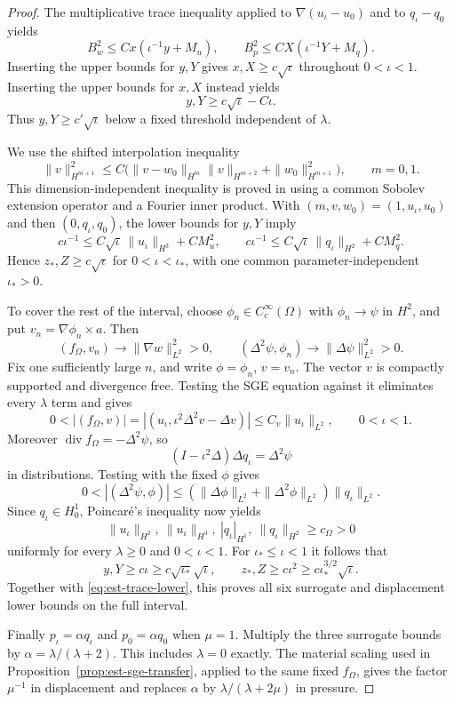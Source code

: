 \documentclass[11pt,a4paper]{article}
\theoremstyle{remark}
\numberwithin{equation}{section}
\begin{document}
\begin{proof}
The multiplicative trace inequality applied to
$\nabla(u_\iota-u_0)$ and to $q_\iota-q_0$ yields
\begin{equation}\label{eq:est-trace-lower}
 B_w^2\le Cx(\iota^{-1}y+M_u),
 \qquad B_p^2\le CX(\iota^{-1}Y+M_q).
\end{equation}
Inserting the upper bounds for $y,Y$ gives
$x,X\ge c\sqrt\iota$ throughout $0<\iota<1$.
Inserting the upper bounds for $x,X$ instead yields
\[
 y,Y\ge c\sqrt\iota-C\iota.
\]
Thus $y,Y\ge c'\sqrt\iota$ below a fixed threshold independent of
$\lambda$.

We use the shifted interpolation inequality
\begin{equation}\label{eq:est-shifted-interpolation}
 \|v\|_{H^{m+1}}^2
 \le C\bigl(\|v-w_0\|_{H^m}\|v\|_{H^{m+2}}
                      +\|w_0\|_{H^{m+1}}^2\bigr),\qquad m=0,1.
\end{equation}
This dimension-independent inequality is proved in
\cite[proof of Proposition~3.5]{PolygonCompanion2026} using a common
Sobolev extension operator and a Fourier inner product.
With $(m,v,w_0)=(1,u_\iota,u_0)$ and then
$(0,q_\iota,q_0)$, the lower bounds for $y,Y$ imply
\[
 c\iota^{-1}\le C\sqrt\iota\,\|u_\iota\|_{H^3}+CM_u^2,
 \qquad
 c\iota^{-1}\le C\sqrt\iota\,\|q_\iota\|_{H^2}+CM_q^2.
\]
Hence $z_*,Z\ge c\sqrt\iota$ for
$0<\iota<\iota_*$, with one common parameter-independent
$\iota_*>0$.

To cover the rest of the interval, choose
$\phi_n\in C_c^\infty(\Omega)$ with $\phi_n\to\psi$ in $H^2$, and
put $v_n=\nabla\phi_n\times a$. Then
\[
 (f_\Omega,v_n)\longrightarrow\|\nabla w\|_{L^2}^2>0,
 \qquad
 (\Delta^2\psi,\phi_n)\longrightarrow\|\Delta\psi\|_{L^2}^2>0.
\]
Fix one sufficiently large $n$, and write $\phi=\phi_n$, $v=v_n$.
The vector $v$ is compactly supported and divergence free. Testing the
SGE equation against it eliminates every $\lambda$ term and gives
\[
 0<|(f_\Omega,v)|
 =|(u_\iota,\iota^2\Delta^2v-\Delta v)|
 \le C_v\|u_\iota\|_{L^2},\qquad 0<\iota<1.
\]
Moreover $\operatorname{div}f_\Omega=-\Delta^2\psi$, so
\[
 (I-\iota^2\Delta)\Delta q_\iota=\Delta^2\psi
\]
in distributions. Testing with the fixed $\phi$ gives
\[
 0<|(\Delta^2\psi,\phi)|
 \le(\|\Delta\phi\|_{L^2}+\|\Delta^2\phi\|_{L^2})
                  \|q_\iota\|_{L^2}.
\]
Since $q_\iota\in H_0^1$, Poincar\'e's inequality now yields
\[
 \|u_\iota\|_{H^2},\ \|u_\iota\|_{H^3},\
 |q_\iota|_{H^1},\ \|q_\iota\|_{H^2}\ge c_\Omega>0
\]
uniformly for every $\lambda\ge0$ and $0<\iota<1$.
For $\iota_*\le\iota<1$ it follows that
\[
 y,Y\ge c\iota\ge c\sqrt{\iota_*}\sqrt\iota,
 \qquad
 z_*,Z\ge c\iota^2\ge c\iota_*^{3/2}\sqrt\iota.
\]
Together with \eqref{eq:est-trace-lower}, this proves all six surrogate
and displacement lower bounds on the full interval.

Finally $p_\iota=\alpha q_\iota$ and $p_0=\alpha q_0$ when $\mu=1$.
Multiply the three surrogate bounds by $\alpha=\lambda/(\lambda+2)$.
This includes $\lambda=0$ exactly. The material scaling used in
Proposition~\ref{prop:est-sge-transfer}, applied to the same fixed
$f_\Omega$, gives the factor $\mu^{-1}$ in displacement and replaces
$\alpha$ by $\lambda/(\lambda+2\mu)$ in pressure.
\end{proof}
\end{document}
